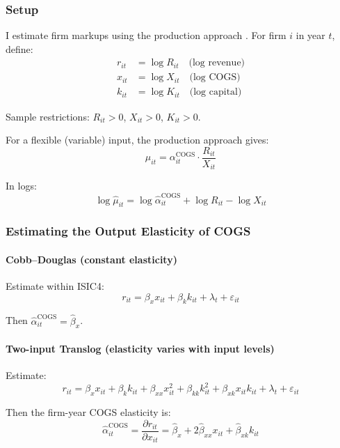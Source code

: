 \documentclass[12pt]{article}
\begin{document}
\subsubsection{Setup}

I estimate firm markups using the production approach \parencite{deridderHitchhikersGuideMarkup2026,deloeckerMarkupsFirmLevelExport2012}. For firm $i$ in year $t$, define:
\begin{align*}
r_{it} &= \log R_{it} \quad \text{(log revenue)} \\
x_{it} &= \log X_{it} \quad \text{(log COGS)} \\
k_{it} &= \log K_{it} \quad \text{(log capital)}
\end{align*}

Sample restrictions: $R_{it} > 0$, $X_{it} > 0$, $K_{it} > 0$.

For a flexible (variable) input, the production approach gives:
\[
\mu_{it} = \alpha_{it}^{\text{COGS}} \cdot \frac{R_{it}}{X_{it}}
\]

In logs:
\[
\log \hat{\mu}_{it} = \log \hat{\alpha}_{it}^{\text{COGS}} + \log R_{it} - \log X_{it}
\]

\subsubsection{Estimating the Output Elasticity of COGS}

\paragraph{Cobb--Douglas (constant elasticity)}

Estimate within ISIC4:
\[
r_{it} = \beta_x x_{it} + \beta_k k_{it} + \lambda_t + \varepsilon_{it}
\]

Then $\hat{\alpha}_{it}^{\text{COGS}} = \hat{\beta}_x$.

\paragraph{Two-input Translog (elasticity varies with input levels)}

Estimate:
\[
r_{it} = \beta_x x_{it} + \beta_k k_{it} + \beta_{xx} x_{it}^2 + \beta_{kk} k_{it}^2 + \beta_{xk} x_{it} k_{it} + \lambda_t + \varepsilon_{it}
\]

Then the firm-year COGS elasticity is:
\[
\hat{\alpha}_{it}^{\text{COGS}} = \frac{\partial r_{it}}{\partial x_{it}} = \hat{\beta}_x + 2\hat{\beta}_{xx} x_{it} + \hat{\beta}_{xk} k_{it}
\]
\end{document}
